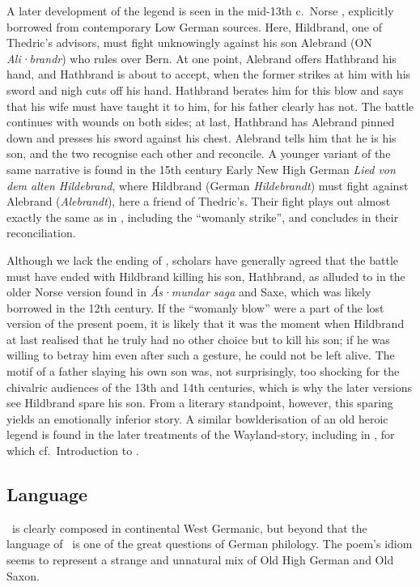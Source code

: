 A later development of the legend is seen in the mid-13th c.~Norse \ThidreksSaga, explicitly borrowed from contemporary Low German sources.  Here, Hildbrand, one of Thedric’s advisors, must fight unknowingly against his son Alebrand (ON \emph{Ali·brandr}) who rules over Bern.  At one point, Alebrand offers Hathbrand his hand, and Hathbrand is about to accept, when the former strikes at him with his sword and nigh cuts off his hand.  Hathbrand berates him for this blow and says that his wife must have taught it to him, for his father clearly has not.  The battle continues with wounds on both sides; at last, Hathbrand has Alebrand pinned down and presses his sword against his chest.  Alebrand tells him that he is his son, and the two recognise each other and reconcile.
A younger variant of the same narrative is found in the 15th century Early New High German \emph{Lied von dem alten Hildebrand}, where Hildbrand (German \emph{Hildebrandt}) must fight against Alebrand (\emph{Alebrandt}), here a friend of Thedric’s.  Their fight plays out almost exactly the same as in \ThidreksSaga, including the “womanly strike”, and concludes in their reconciliation.

Although we lack the ending of \Hildebrandslied, scholars have generally agreed that the battle must have ended with Hildbrand killing his son, Hathbrand, as alluded to in the older Norse version found in \emph{Ás·mundar saga} and Saxe, which was likely borrowed in the 12th century.  If the “womanly blow” were a part of the lost version of the present poem, it is likely that it was the moment when Hildbrand at last realised that he truly had no other choice but to kill his son; if he was willing to betray him even after such a gesture, he could not be left alive.  The motif of a father slaying his own son was, not surprisingly, too shocking for the chivalric audiences of the 13th and 14th centuries, which is why the later versions see Hildbrand spare his son.  From a literary standpoint, however, this sparing yields an emotionally inferior story.  A similar bowlderisation of an old heroic legend is found in the later treatments of the Wayland-story, including in \ThidreksSaga, for which cf.~Introduction to .

\subsection{Language}

\Hildebrandslied\ is clearly composed in continental West Germanic, but beyond that the language of \Hildebrandslied\ is one of the great questions of German philology.  The poem’s idiom seems to represent a strange and unnatural mix of Old High German and Old Saxon.

